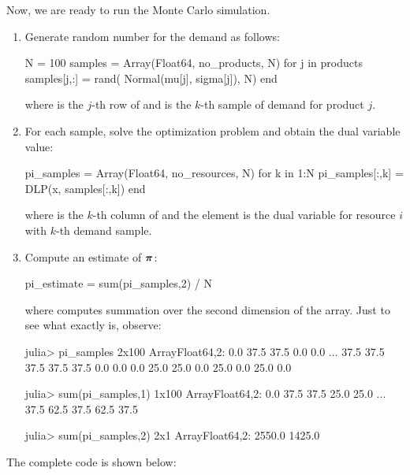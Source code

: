 Now, we are ready to run the Monte Carlo simulation.
\begin{enumerate}
\item Generate random number for the demand as follows:
\begin{code}
N = 100
samples = Array(Float64, no_products, N)
for j in products
    samples[j,:] = rand( Normal(mu[j], sigma[j]), N)
end
\end{code}
\noindent where  is the $j$-th row of  and  is the $k$-th sample of demand for product $j$.

\item For each sample, solve the optimization problem and obtain the dual variable value:
\begin{code}
pi_samples = Array(Float64, no_resources, N)
for k in 1:N
    pi_samples[:,k] = DLP(x, samples[:,k])
end
\end{code}
\noindent where  is the $k$-th column of  and the element  is the dual variable for resource $i$ with $k$-th demand sample.

\item Compute an estimate of $\boldsymbol{\pi}$:
\begin{code}
pi_estimate = sum(pi_samples,2) / N
\end{code}
\noindent where  computes summation over the second dimension of the  array. Just to see what exactly  is, observe:
\begin{code}
julia> pi_samples
2x100 Array{Float64,2}:
 0.0  37.5  37.5   0.0   0.0    ...    37.5  37.5  37.5  37.5  37.5
 0.0   0.0   0.0  25.0  25.0            0.0  25.0   0.0  25.0   0.0

julia> sum(pi_samples,1)
1x100 Array{Float64,2}:
 0.0  37.5  37.5  25.0  25.0    ...    37.5  62.5  37.5  62.5  37.5

julia> sum(pi_samples,2)
2x1 Array{Float64,2}:
 2550.0
 1425.0
\end{code}


\end{enumerate}


The complete code is shown below:
\begin{codelisting}
\end{codelisting}

